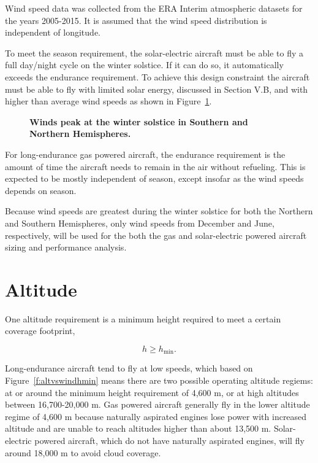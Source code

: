 Wind speed data was collected from the ERA Interim atmospheric datasets for the years 2005-2015.\cite{wind} 
It is assumed that the wind speed distribution is independent of longitude. 

To meet the season requirement, the solar-electric aircraft must be able to fly a full day/night cycle on the winter solstice.  
If it can do so, it automatically exceeds the endurance requirement. 
To achieve this design constraint the aircraft must be able to fly with limited solar energy, discussed in Section V.B, and with higher than average wind speeds as shown in Figure~\ref{f:windvsmonth}.  

\begin{figure}[h!]
 \begin{subfigmatrix}{2}%
 \end{subfigmatrix}
 \caption{\textbf{Winds peak at the winter solstice in Southern and Northern Hemispheres.\cite{wind}}}
 \label{f:windvsmonth}
\end{figure}

For long-endurance gas powered aircraft, the endurance requirement is the amount of time the aircraft needs to remain in the air without refueling.  
This is expected to be mostly independent of season, except insofar as the wind speeds depends on season. 

Because wind speeds are greatest during the winter solstice for both the Northern and Southern Hemispheres, only wind speeds from December and June, respectively, will be used for the both the gas and solar-electric powered aircraft sizing and performance analysis. 

\section{Altitude}

One altitude requirement is a minimum height required to meet a certain coverage footprint,

\begin{equation}
 h \geq h_{\text{min}}.
\end{equation}

Long-endurance aircraft tend to fly at low speeds, which based on Figure~\ref{f:altvswindhmin} means there are two possible operating altitude regiems: at or around the minimum height requirement of 4,600 m, or at high altitudes between 16,700-20,000 m. 
Gas powered aircraft generally fly in the lower altitude regime of 4,600 m because naturally aspirated engines lose power with increased altitude and are unable to reach altitudes higher than about 13,500 m.  
Solar-electric powered aircraft, which do not have naturally aspirated engines, will fly around 18,000 m to avoid cloud coverage.


